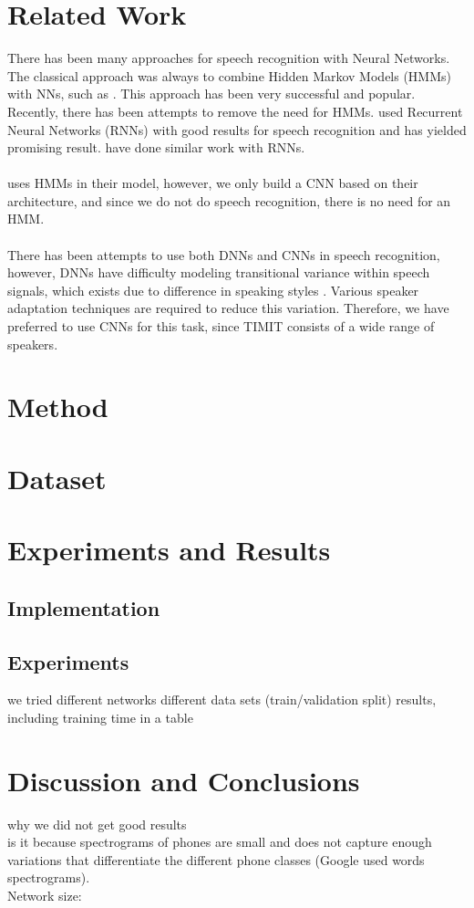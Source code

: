 \documentclass[a4paper,12pt]{article}
\begin{document}
\section{Related Work}
There has been many approaches for speech recognition with Neural Networks. The classical approach was always to combine Hidden Markov Models (HMMs) with NNs, such as \cite{robinson1994application}. This approach has been very successful and popular. Recently, there has been attempts to remove the need for HMMs. \cite{graves2013speech} used Recurrent Neural Networks (RNNs) with good results for speech recognition and has yielded promising result. \cite{graves2014towards} have done similar work with RNNs.\\\\
\cite{sainath2013deep} uses HMMs in their model, however, we only build a CNN based on their architecture, and since we do not do speech recognition, there is no need for an HMM.\\\\
There has been attempts to use both DNNs and CNNs in speech recognition, however, DNNs have difficulty modeling transitional variance within speech signals, which exists due to difference in speaking styles \cite{lecun1995convolutional}. Various speaker adaptation techniques are required to reduce this variation. Therefore, we have preferred to use CNNs for this task, since TIMIT consists of a wide range of speakers.

\section{Method}


\section{Dataset}\label{sec:spect}


\section{Experiments and Results}
\subsection{Implementation}
\label{sec:impl}

\subsection{Experiments}
we tried different networks 
different data sets (train/validation split)
results, including training time
in a table
\section{Discussion and Conclusions}
why we did not get good results\\
is it because spectrograms of phones are small and does not capture enough variations that differentiate the different phone classes (Google used words spectrograms).\\
Network size:



\end{document}
